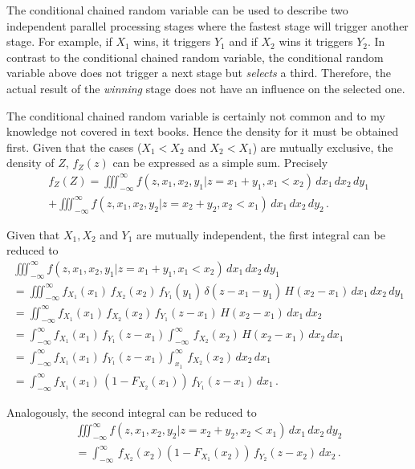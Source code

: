 The conditional chained random variable can be used to describe two independent parallel processing
stages where the fastest stage will trigger another stage. For example, if $X_1$ wins, it triggers $Y_1$
and if $X_2$ wins it triggers $Y_2$. In contrast to the conditional chained random variable, the 
conditional random variable above does not trigger a next stage but \emph{selects} a third. 
Therefore, the actual result of the \emph{winning} stage does not have an influence on the 
selected one. 

The conditional chained random variable is certainly not common and to my knowledge not
covered in text books. Hence the density for it must be obtained first.
Given that the cases ($X_1<X_2$ and $X_2<X_1$) are mutually exclusive, the density of $Z$, 
$f_Z(z)$ can be expressed as a simple sum. Precisely
\begin{multline}
 f_Z(Z) = \iiint_{-\infty}^\infty f(z,x_1,x_2,y_1|z=x_1+y_1,x_1<x_2)\,dx_1\,dx_2\,dy_1 \\
  + \iiint_{-\infty}^\infty f(z,x_1,x_2,y_2|z=x_2+y_2,x_2<x_1)\,dx_1\,dx_2\,dy_2\,. \nonumber
\end{multline}

Given that $X_1, X_2$ and $Y_1$ are mutually independent, the first integral can be reduced to
\begin{multline}
\iiint_{-\infty}^\infty f(z,x_1,x_2,y_1|z=x_1+y_1,x_1<x_2)\,dx_1\,dx_2\,dy_1 \\
  = \iiint_{-\infty}^\infty f_{X_1}(x_1)\,f_{X_2}(x_2)\,f_{Y_1}(y_1)\,\delta(z-x_1-y_1)\,H(x_2-x_1)\,dx_1\,dx_2\,dy_1\\
  = \iint_{-\infty}^\infty f_{X_1}(x_1)\,f_{X_2}(x_2)\,f_{Y_1}(z-x_1)\,H(x_2-x_1)\,dx_1\,dx_2\\
  = \int_{-\infty}^\infty f_{X_1}(x_1)\,f_{Y_1}(z-x_1)\int_{-\infty}^\infty \,f_{X_2}(x_2)\,H(x_2-x_1)\,dx_2\,dx_1\\
  = \int_{-\infty}^\infty f_{X_1}(x_1)\,f_{Y_1}(z-x_1)\int_{x_1}^{\infty} \,f_{X_2}(x_2)\,dx_2\,dx_1\\
  = \int_{-\infty}^\infty f_{X_1}(x_1)\,\left(1-F_{X_2}(x_1)\right)\,f_{Y_1}(z-x_1)\,dx_1\,. \nonumber
\end{multline}

Analogously, the second integral can be reduced to
\begin{multline}
\iiint_{-\infty}^\infty f(z,x_1,x_2,y_2|z=x_2+y_2,x_2<x_1)\,dx_1\,dx_2\,dy_2 \\
 = \int_{-\infty}^\infty \,f_{X_2}(x_2)\left(1-F_{X_1}(x_2)\right)\,f_{Y_2}(z-x_2)\,dx_2\,. \nonumber
\end{multline}

